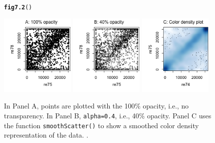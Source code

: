 \documentclass[12pt, a4paper,  BCOR=8.25mm, DIV=15]{scrartcl}\usepackage[]{graphicx}\usepackage[]{color}
\makeatletter
\newcommand{\hlstd}[1]{\textcolor[rgb]{0.345,0.345,0.345}{#1}}%
\newcommand{\hlkwd}[1]{\textcolor[rgb]{0.737,0.353,0.396}{\textbf{#1}}}%
\newenvironment{kframe}{%
 \def\at@end@of@kframe{}%
 \ifinner\ifhmode%
  \def\at@end@of@kframe{\end{minipage}}%
  \begin{minipage}{\columnwidth}%
 \fi\fi%
 \def\FrameCommand##1{\hskip\@totalleftmargin \hskip-\fboxsep
 \colorbox{shadecolor}{##1}\hskip-\fboxsep
     \hskip-\linewidth \hskip-\@totalleftmargin \hskip\columnwidth}%
 \MakeFramed {\advance\hsize-\width
   \@totalleftmargin\z@ \linewidth\hsize
   \@setminipage}}%
 {\par\unskip\endMakeFramed%
 \at@end@of@kframe}
\newenvironment{knitrout}{}{} %
\newcommand{\txtt}[1]{{\texttt{#1}}}
\makeatother
\begin{document}
\begin{figure}[ht]
\begin{knitrout}
\color{fgcolor}\begin{kframe}
\begin{alltt}
\hlkwd{fig7.2}\hlstd{()}
\end{alltt}
\end{kframe}

{\centering \includegraphics[width=0.32\textwidth]{figure/gph-fig7_2e-1} 
\includegraphics[width=0.32\textwidth]{figure/gph-fig7_2e-2} 
\includegraphics[width=0.32\textwidth]{figure/gph-fig7_2e-3} 

}



\end{knitrout}
\caption{In Panel A, points are plotted with the 100\% opacity, i.e.,
  no transparency. In Panel B, \txtt{alpha=0.4}, i.e., 40\% opacity.
  Panel C uses the function \txtt{smoothScatter()} to show a smoothed
  color density representation of the data.
  \label{fig:alpha}.}
\end{figure}
\end{document}
